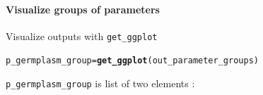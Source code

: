 \documentclass{article}\usepackage[]{graphicx}\usepackage[]{color}
\makeatletter
\newcommand{\hlstd}[1]{\textcolor[rgb]{0.345,0.345,0.345}{#1}}%
\newcommand{\hlkwb}[1]{\textcolor[rgb]{0.69,0.353,0.396}{#1}}%
\newcommand{\hlkwd}[1]{\textcolor[rgb]{0.737,0.353,0.396}{\textbf{#1}}}%
\newenvironment{kframe}{%
 \def\at@end@of@kframe{}%
 \ifinner\ifhmode%
  \def\at@end@of@kframe{\end{minipage}}%
  \begin{minipage}{\columnwidth}%
 \fi\fi%
 \def\FrameCommand##1{\hskip\@totalleftmargin \hskip-\fboxsep
 \colorbox{shadecolor}{##1}\hskip-\fboxsep
     \hskip-\linewidth \hskip-\@totalleftmargin \hskip\columnwidth}%
 \MakeFramed {\advance\hsize-\width
   \@totalleftmargin\z@ \linewidth\hsize
   \@setminipage}}%
 {\par\unskip\endMakeFramed%
 \at@end@of@kframe}
\newenvironment{knitrout}{}{} %
\makeatother
\begin{document}
\paragraph{Visualize groups of parameters}

Visualize outputs with \texttt{get\_ggplot}

\begin{knitrout}
\color{fgcolor}\begin{kframe}
\begin{alltt}
\hlstd{p_germplasm_group} \hlkwb{=} \hlkwd{get_ggplot}\hlstd{(out_parameter_groups)}
\end{alltt}
\end{kframe}
\end{knitrout}

\texttt{p\_germplasm\_group} is list of two elements :
\end{document}
